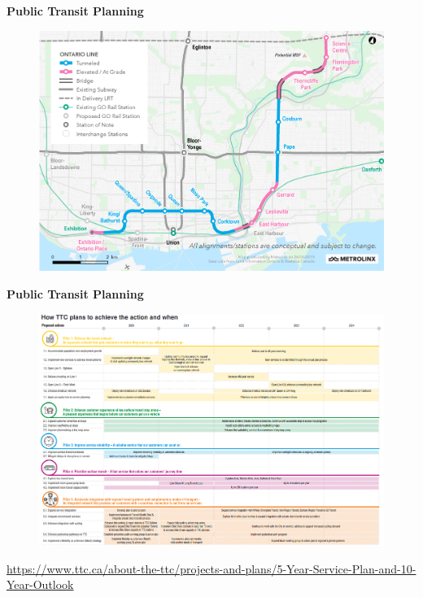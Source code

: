 \documentclass[aspectratio=169]{beamer}
\begin{document}
\begin{frame}
	
	\textbf{Public Transit Planning}
	
	
	
	\begin{figure}
		\centering
		\includegraphics[width=0.8\linewidth]{images/mx_plan_2019.png}
	\end{figure}
	
	
\end{frame}






\begin{frame}
	
	\textbf{Public Transit Planning}
	
	
	
	\begin{figure}
		\centering
		\includegraphics[width=0.8\linewidth]{images/ttc-5-year.png}
	\end{figure}
	
	\tiny\url{https://www.ttc.ca/about-the-ttc/projects-and-plans/5-Year-Service-Plan-and-10-Year-Outlook}
	
\end{frame}
\end{document}
